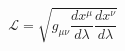 \documentclass{beamer}
\begin{document}
\begin{frame}
\begin{equation}
    \mathcal{L} = \sqrt{g_{\mu\nu} \frac{dx^\mu}{d\lambda} \frac{dx^\nu}{d\lambda}}
\end{equation}
\end{frame}
\end{document}
